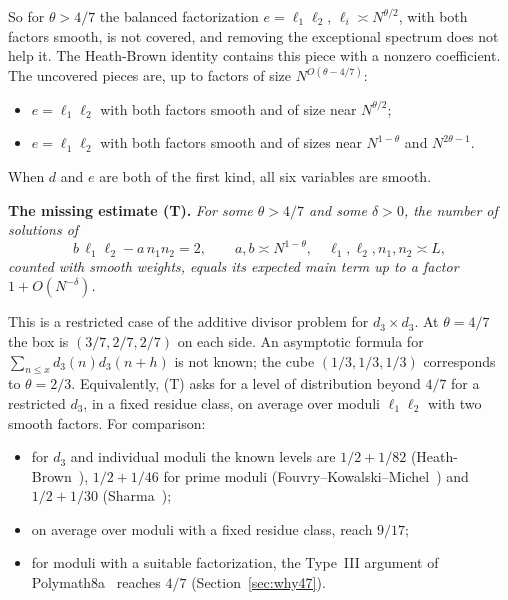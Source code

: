 \documentclass[11pt]{amsart}
\theoremstyle{definition}
\theoremstyle{remark}
\numberwithin{equation}{section}
\begin{document}
So for $\theta>4/7$ the balanced factorization $e=\ell_1\ell_2$,
$\ell_i\asymp N^{\theta/2}$, with both factors smooth, is not covered, and
removing the exceptional spectrum does not help it.  The Heath-Brown
identity contains this piece with a nonzero coefficient.  The uncovered
pieces are, up to factors of size $N^{O(\theta-4/7)}$:
\begin{itemize}
\item $e=\ell_1\ell_2$ with both factors smooth and of size near
$N^{\theta/2}$;
\item $e=\ell_1\ell_2$ with both factors smooth and of sizes near
$N^{1-\theta}$ and $N^{2\theta-1}$.
\end{itemize}
When $d$ and $e$ are both of the first kind, all six variables are smooth.

\medskip
\noindent\textbf{The missing estimate (T).}  \emph{For some $\theta>4/7$
and some $\delta>0$, the number of solutions of
\begin{equation}\label{eq:T}
 b\,\ell_1\ell_2-a\,n_1n_2=2,\qquad a,b\asymp N^{1-\theta},\quad
 \ell_1,\ell_2,n_1,n_2\asymp L,
\end{equation}
counted with smooth weights, equals its expected main term up to a factor
$1+O(N^{-\delta})$.}

\medskip
This is a restricted case of the additive divisor problem for
$d_3\times d_3$.  At $\theta=4/7$ the box is $(3/7,2/7,2/7)$ on each side.
An asymptotic formula for $\sum_{n\le x}d_3(n)d_3(n+h)$ is not known; the
cube $(1/3,1/3,1/3)$ corresponds to $\theta=2/3$.  Equivalently, (T) asks
for a level of distribution beyond $4/7$ for a restricted $d_3$, in a fixed
residue class, on average over moduli $\ell_1\ell_2$ with two smooth
factors.  For comparison:
\begin{itemize}
\item for $d_3$ and individual moduli the known levels are $1/2+1/82$
(Heath-Brown~\cite{HB86}), $1/2+1/46$ for prime moduli
(Fouvry--Kowalski--Michel~\cite{FKM3}) and $1/2+1/30$
(Sharma~\cite{Sha});
\item on average over moduli with a fixed residue class, \cite{FKM3} reach
$9/17$;
\item for moduli with a suitable factorization, the Type~III argument of
Polymath8a~\cite{Polymath8a} reaches $4/7$ (Section~\ref{sec:why47}).
\end{itemize}
\end{document}
